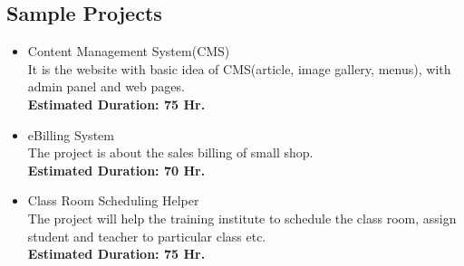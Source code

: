\documentclass[12pt,a4paper]{article}
\begin{document}
\subsection*{Sample Projects}
    \begin{itemize}
        \item Content Management System(CMS) \\
                It is the website with basic idea of CMS(article, image gallery, menus), with admin panel and web pages.
                \\
                \textbf{Estimated Duration: 75 Hr.}

        \item eBilling System \\
                The project is about the sales billing of small shop.
                \\
                \textbf{Estimated Duration: 70 Hr.}
        \item Class Room Scheduling Helper \\
                The project will help the training institute to schedule the class room, assign student and teacher to particular class etc.
                \\
                \textbf{Estimated Duration: 75 Hr.}
    \end{itemize}
\end{document}
